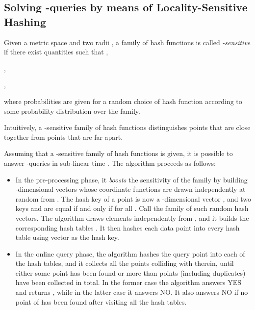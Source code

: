 \subsection{Solving -\pleb queries by means of Locality-Sensitive Hashing}
\label{sec:lsh-ernn}

\begin{defn}\label{def:lshashfunc}
  Given a metric space  and two radii , a family
   of hash functions is called {\em
    -sensitive} if there exist quantities  such that ,
  \begin{slist}
  \item[]   ,
  \item[]   ,
  \end{slist}
  where probabilities are given for a random choice of hash
  function  according to some probability distribution
  over the family.
\end{defn}
Intuitively, a -sensitive family of hash functions
distinguishes points that are close together from points
that are far apart. 

Assuming that a -sensitive family  of hash
functions is given, it is possible to answer -\pleb queries in
sub-linear time \citep{GIM99,IM98}. The algorithm proceeds as follows:
\begin{itemize}
\item In the pre-processing phase, it {\em boosts} the sensitivity of
  the family  by building -dimensional vectors  whose coordinate functions  are drawn
  independently at random from . The hash key of a point 
  is now a -dimensional vector , and
  two keys  and  are equal if and only if
   for all . Call  the family of
  such random hash vectors. The algorithm draws  elements  independently from , and it builds the 
  corresponding hash tables . It then hashes each
  data point  into every hash table  using vector
   as the hash key.

\item In the online query phase, the algorithm hashes the query point
   into each of the  hash tables, and it collects all the
  points colliding with  therein, until either some point  has been found or more than  points
  (including duplicates) have been collected in total. In the former
  case the algorithm answers YES and returns , while in the latter
  case it answers NO. It also answers NO if no point of
   has been found after visiting all the hash
  tables.
\end{itemize}

